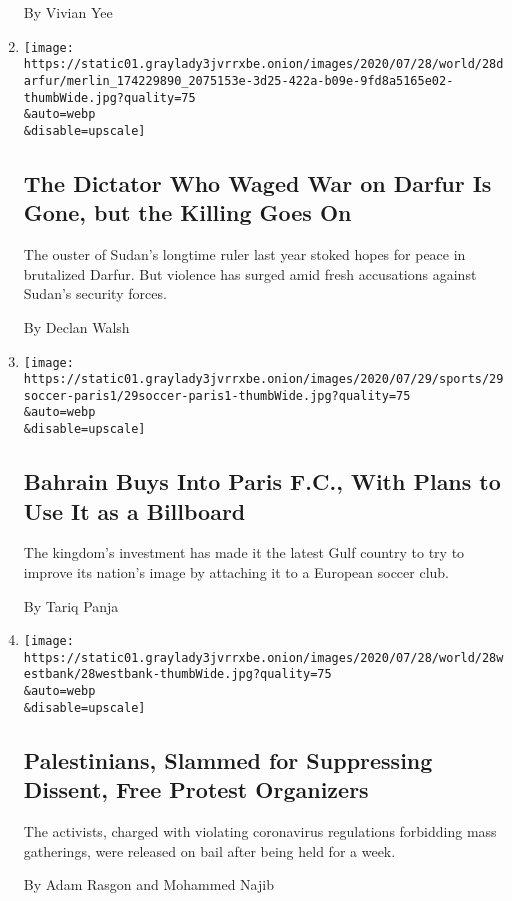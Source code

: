 \begin{enumerate}
  By Vivian Yee
\item
  \href{/2020/07/30/world/middleeast/darfur-sudan.html}{}

  \texttt{[image: https://static01.graylady3jvrrxbe.onion/images/2020/07/28/world/28darfur/merlin\_174229890\_2075153e-3d25-422a-b09e-9fd8a5165e02-thumbWide.jpg?quality=75\\\&auto=webp\\\&disable=upscale]}

  \hypertarget{the-dictator-who-waged-war-on-darfur-is-gone-but-the-killing-goes-on}{%
  \subsection{The Dictator Who Waged War on Darfur Is Gone, but the
  Killing Goes
  On}\label{the-dictator-who-waged-war-on-darfur-is-gone-but-the-killing-goes-on}}

  The ouster of Sudan's longtime ruler last year stoked hopes for peace
  in brutalized Darfur. But violence has surged amid fresh accusations
  against Sudan's security forces.

  By Declan Walsh
\item
  \href{/2020/07/29/sports/soccer/paris-fc-bahrain.html}{}

  \texttt{[image: https://static01.graylady3jvrrxbe.onion/images/2020/07/29/sports/29soccer-paris1/29soccer-paris1-thumbWide.jpg?quality=75\\\&auto=webp\\\&disable=upscale]}

  \hypertarget{bahrain-buys-into-paris-fc-with-plans-to-use-it-as-a-billboard}{%
  \subsection{Bahrain Buys Into Paris F.C., With Plans to Use It as a
  Billboard}\label{bahrain-buys-into-paris-fc-with-plans-to-use-it-as-a-billboard}}

  The kingdom's investment has made it the latest Gulf country to try to
  improve its nation's image by attaching it to a European soccer club.

  By Tariq Panja
\item
  \href{/2020/07/28/world/middleeast/west-bank-protest-activists.html}{}

  \texttt{[image: https://static01.graylady3jvrrxbe.onion/images/2020/07/28/world/28westbank/28westbank-thumbWide.jpg?quality=75\\\&auto=webp\\\&disable=upscale]}

  \hypertarget{palestinians-slammed-for-suppressing-dissent-free-protest-organizers}{%
  \subsection{Palestinians, Slammed for Suppressing Dissent, Free
  Protest
  Organizers}\label{palestinians-slammed-for-suppressing-dissent-free-protest-organizers}}

  The activists, charged with violating coronavirus regulations
  forbidding mass gatherings, were released on bail after being held for
  a week.

  By Adam Rasgon and Mohammed Najib
\end{enumerate}

